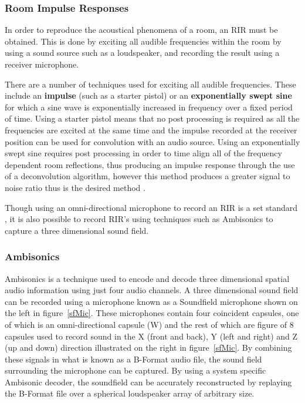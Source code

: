 \documentclass[../../main.tex]{subfiles}
\begin{document}
		\subsubsection{Room Impulse Responses}

			In order to reproduce the acoustical phenomena of a room, an \ac{RIR} must be obtained. This is done by exciting all audible frequencies within the room by using a sound source such as a loudspeaker, and recording the result using a receiver microphone.

			There are a number of techniques used for exciting all audible frequencies. These include an \textbf{impulse} (such as a starter pistol) or an \textbf{exponentially swept sine} for which a sine wave is exponentially increased in frequency over a fixed period of time. Using a starter pistol means that no post processing is required as all the frequencies are excited at the same time and the impulse recorded at the receiver position can be used for convolution with an audio source. Using an exponentially swept sine requires post processing in order to time align all of the frequency dependent room reflections, thus producing an impulse response through the use of a deconvolution algorithm, however this method produces a greater signal to noise ratio thus is the desired method \cite{Stan2002}. 

			Though using an omni-directional microphone to record an \ac{RIR} is a set standard \cite{ISO}, it is also possible to record \ac{RIR}'s using techniques such as Ambisonics to capture a three dimensional sound field.

		

		\subsubsection{Ambisonics}

			Ambisonics is a technique used to encode and decode three dimensional spatial audio information using just four audio channels. A three dimensional sound field can be recorded using a microphone known as a Soundfield microphone shown on the left in figure~\ref{sfMic}. These microphones contain four coincident capsules, one of which is an omni-directional capsule (W) and the rest of which are figure of 8 capsules used to record sound in the X (front and back), Y (left and right) and Z (up and down) direction illustrated on the right in figure~\ref{sfMic}. By combining these signals in what is known as a B-Format audio file, the sound field surrounding the microphone can be captured. By using a system specific Ambisonic decoder, the soundfield can be accurately reconstructed by replaying the B-Format file over a spherical loudspeaker array of arbitrary size.
\end{document}
